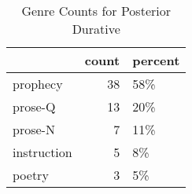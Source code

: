 \begin{table}[htbp!]
\centering
\caption{Genre Counts for Posterior Durative}
\label{table:postdur_gen_cp}
\begin{tabular}{lrl}
\toprule
{} &  count & percent \\
\midrule
prophecy    &     38 &     58\% \\
prose-Q     &     13 &     20\% \\
prose-N     &      7 &     11\% \\
instruction &      5 &      8\% \\
poetry      &      3 &      5\% \\
\bottomrule
\end{tabular}
\end{table}
